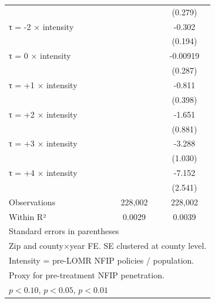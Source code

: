 \begin{table}[htbp]
\begin{tabular}{l*{2}{c}}
                    &                     &     (0.279)         \\
[0.15em]
τ = -2 × intensity  &                     &      -0.302         \\
                    &                     &     (0.194)         \\
[0.15em]
τ = 0 × intensity   &                     &    -0.00919         \\
                    &                     &     (0.287)         \\
[0.15em]
τ = +1 × intensity  &                     &      -0.811\sym{**} \\
                    &                     &     (0.398)         \\
[0.15em]
τ = +2 × intensity  &                     &      -1.651\sym{*}  \\
                    &                     &     (0.881)         \\
[0.15em]
τ = +3 × intensity  &                     &      -3.288\sym{***}\\
                    &                     &     (1.030)         \\
[0.15em]
τ = +4 × intensity  &                     &      -7.152\sym{***}\\
                    &                     &     (2.541)         \\
\hline
Observations        &     228,002         &     228,002         \\
Within R²           &      0.0029         &      0.0039         \\
\hline\hline
\multicolumn{3}{l}{\footnotesize Standard errors in parentheses}\\
\multicolumn{3}{l}{\footnotesize Zip and county×year FE. SE clustered at county level.}\\
\multicolumn{3}{l}{\footnotesize Intensity = pre-LOMR NFIP policies / population.}\\
\multicolumn{3}{l}{\footnotesize Proxy for pre-treatment NFIP penetration.}\\
\multicolumn{3}{l}{\footnotesize \sym{*} \(p<0.10\), \sym{**} \(p<0.05\), \sym{***} \(p<0.01\)}\\
\end{tabular}
\end{table}
